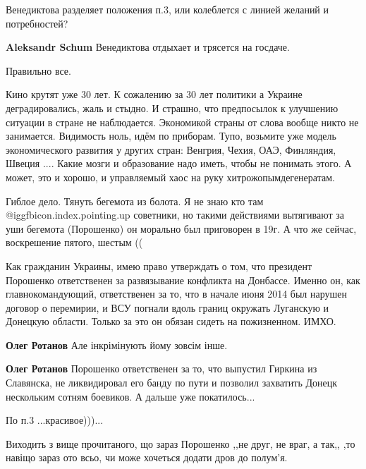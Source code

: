 \begin{itemize}
Венедиктова разделяет положения п.3, или колеблется с линией желаний и потребностей?

\textbf{Aleksandr Schum} Венедиктова отдыхает и трясется на госдаче.

Правильно все.


Кино крутят уже 30 лет. К сожалению за 30 лет политики а Украине
деградировались, жаль и стыдно. И страшно, что предпосылок к улучшению ситуации
в стране не наблюдается. Экономикой страны от слова вообще никто не занимается.
Видимость ноль, идём по приборам. Тупо, возьмите уже модель экономического
развития у других стран: Венгрия, Чехия, ОАЭ, Финляндия, Швеция .... Какие
мозги и образование надо иметь, чтобы не понимать этого. А может, это и хорошо,
и управляемый хаос на руку хитрожопымдегенератам.


Гиблое дело. Тянуть бегемота из болота. Я не знаю кто там
@igg{fbicon.index.pointing.up} ️советники, но такими действиями вытягивают за
уши бегемота (Порошенко) он морально был приговорен в 19г. А что же сейчас,
воскрешение пятого, шестым ((


Как гражданин Украины, имею право утверждать о том, что президент Порошенко
ответственен за развязывание конфликта на Донбассе. Именно он, как
главнокомандующий, ответственен за то, что в начале июня 2014 был нарушен
договор о перемирии, и ВСУ погнали вдоль границ окружать Луганскую и Донецкую
области. Только за это он обязан сидеть на пожизненном. ИМХО.

\begin{itemize} %
\textbf{Олег Ротанов} Але інкрімінують йому зовсім інше.

\textbf{Олег Ротанов} Порошенко ответственен за то, что выпустил Гиркина из Славянска, не ликвидировал его банду по пути и позволил захватить Донецк нескольким сотням боевиков. А дальше уже покатилось...
\end{itemize} %

По п.3 ...красивое)))...


Виходить з вище прочитаного, що зараз Порошенко ,,не друг, не враг, а так,, ,то
навіщо зараз ото всьо, чи може хочеться додати дров до полум'я.


\end{itemize}
